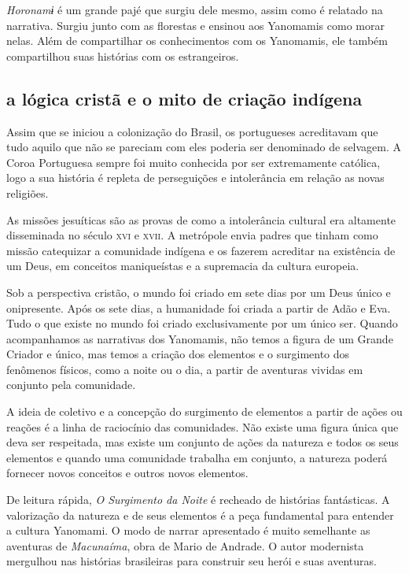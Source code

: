 \emph{Horonamɨ} é um grande pajé que surgiu dele mesmo, assim como é
relatado na narrativa. Surgiu junto com as florestas e ensinou aos
Yanomamis como morar nelas. Além de compartilhar os conhecimentos com os
Yanomamis, ele também compartilhou suas histórias com os estrangeiros.



\subsection{a lógica cristã e o mito de criação indígena}

Assim que se iniciou a colonização do Brasil, os portugueses acreditavam
que tudo aquilo que não se pareciam com eles poderia ser denominado de
selvagem. A Coroa Portuguesa sempre foi muito conhecida por ser
extremamente católica, logo a sua história é repleta de perseguições e
intolerância em relação as novas religiões.

As missões jesuíticas são as provas de como a intolerância cultural era
altamente disseminada no século \textsc{xvi} e \textsc{xvii}. A metrópole envia padres que
tinham como missão catequizar a comunidade indígena e os fazerem
acreditar na existência de um Deus, em conceitos maniqueístas e a
supremacia da cultura europeia.

Sob a perspectiva cristão, o mundo foi criado em sete dias por um Deus
único e onipresente. Após os sete dias, a humanidade foi criada a partir
de Adão e Eva. Tudo o que existe no mundo foi criado exclusivamente por
um único ser. Quando acompanhamos as narrativas dos Yanomamis, não temos
a figura de um Grande Criador e único, mas temos a criação dos elementos
e o surgimento dos fenômenos físicos, como a noite ou o dia, a partir de
aventuras vividas em conjunto pela comunidade.

A ideia de coletivo e a concepção do surgimento de elementos a partir de
ações ou reações é a linha de raciocínio das comunidades. Não existe uma
figura única que deva ser respeitada, mas existe um conjunto de ações da
natureza e todos os seus elementos e quando uma comunidade trabalha em
conjunto, a natureza poderá fornecer novos conceitos e outros novos
elementos.

De leitura rápida, \emph{O Surgimento da Noite} é recheado de
histórias fantásticas. A valorização da natureza e de seus elementos é a
peça fundamental para entender a cultura Yanomami. O modo de narrar
apresentado é muito semelhante as aventuras de \textit{Macunaíma}, obra de Mario
de Andrade. O autor modernista mergulhou nas histórias brasileiras para
construir seu herói e suas aventuras.

